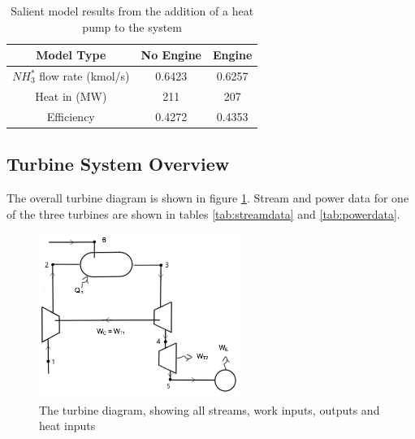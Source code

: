 \documentclass[11pt, oneside]{article}
\begin{document}
\begin {table} [h]
\begin{center}
\caption{Salient model results from the addition of a heat pump to the system} \label{tab:heatengine} 
\begin{tabular}{ |c|c|c| }
 \hline
  Model Type & No Engine & Engine\\ 
  \hline
  $NH_3^*$ flow rate (kmol/s) & 0.6423 & 0.6257\\ 
 \hline
  Heat in (MW) & 211& 207\\
  \hline
  Efficiency & 0.4272 & 0.4353\\
 \hline
\end{tabular}
\end{center}  
\end {table}

\pagebreak
\subsection{Turbine System Overview}
The overall turbine diagram is shown in figure \ref{fig:turbinediagram}. Stream and power data for one of the three turbines are shown in tables \ref{tab:streamdata} and \ref{tab:powerdata}.

\begin{figure} [h]
\centering
\includegraphics[width=0.58\textwidth]{./pictures/plantdiagram.png}
  \caption{The turbine diagram, showing all streams, work inputs, outputs and heat inputs} \label{fig:turbinediagram}
  \end{figure}
  
\end{document}
